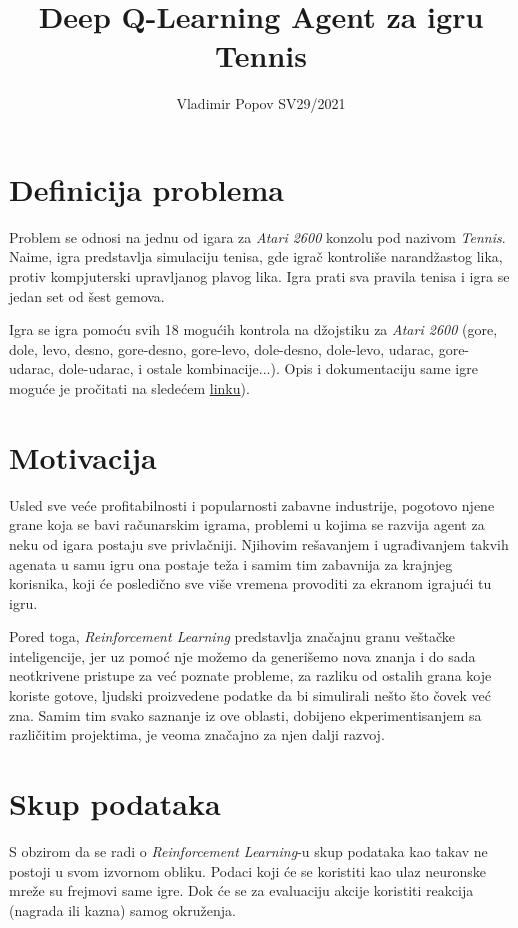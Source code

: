 \documentclass[12pt, a4paper]{article}
\title{Deep Q-Learning Agent za igru Tennis}
\author{Vladimir Popov SV29/2021}
\begin{document}
\maketitle

\section{Definicija problema}

Problem se odnosi na jednu od igara za \textit{Atari 2600} konzolu pod nazivom \textit{Tennis}. Naime, igra predstavlja simulaciju tenisa, gde igrač kontroliše narandžastog lika, protiv kompjuterski upravljanog plavog lika. Igra prati sva pravila tenisa i igra se jedan set od šest gemova.

Igra se igra pomoću svih 18 mogućih kontrola na džojstiku za \textit{Atari 2600} (gore, dole, levo, desno, gore-desno, gore-levo, dole-desno, dole-levo, udarac, gore-udarac, dole-udarac, i ostale kombinacije...). Opis i dokumentaciju same igre moguće je pročitati na sledećem \href{https://atariage.com/manual_html_page.php?SoftwareLabelID=555}{linku}).

\section{Motivacija}

Usled sve veće profitabilnosti i popularnosti zabavne industrije, pogotovo njene grane koja se bavi računarskim igrama, problemi u kojima se razvija agent za neku od igara postaju sve privlačniji. Njihovim rešavanjem i ugrađivanjem takvih agenata u samu igru ona postaje teža i samim tim zabavnija za krajnjeg korisnika, koji će posledično sve više vremena provoditi za ekranom igrajući tu igru.

Pored toga, \textit{Reinforcement Learning} predstavlja značajnu granu veštačke inteligencije, jer uz pomoć nje možemo da generišemo nova znanja i do sada neotkrivene pristupe za već poznate probleme, za razliku od ostalih grana koje koriste gotove, ljudski proizvedene podatke da bi simulirali nešto što čovek već zna. Samim tim svako saznanje iz ove oblasti, dobijeno ekperimentisanjem sa različitim projektima, je veoma značajno za njen dalji razvoj.

\section{Skup podataka}

S obzirom da se radi o \textit{Reinforcement Learning}-u skup podataka kao takav ne postoji u svom izvornom obliku. Podaci koji će se koristiti kao ulaz neuronske mreže su frejmovi same igre. Dok će se za evaluaciju akcije koristiti reakcija (nagrada ili kazna) samog okruženja.
\end{document}
